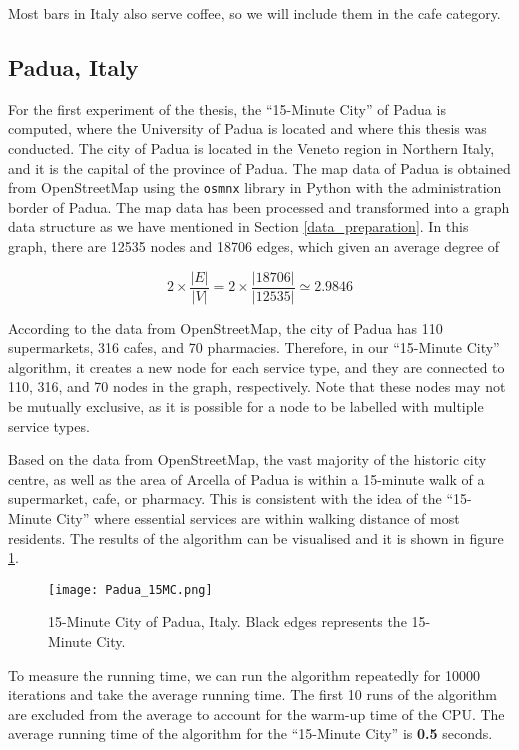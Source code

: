 Most bars in Italy also serve coffee, so we will include them in the cafe category.

\subsection{Padua, Italy}

For the first experiment of the thesis, the ``15-Minute City'' of Padua is computed, where the University of Padua is located and where this thesis was conducted. The city of Padua is located in the Veneto region in Northern Italy, and it is the capital of the province of Padua. The map data of Padua is obtained from OpenStreetMap using the \verb|osmnx| library in Python with the administration border of Padua. The map data has been processed and transformed into a graph data structure as we have mentioned in Section \ref{data_preparation}. In this graph, there are 12535 nodes and 18706 edges, which given an average degree of

$$2\times\frac{|E|}{|V|}=2\times\frac{|18706|}{|12535|}\simeq2.9846$$

According to the data from OpenStreetMap, the city of Padua has 110 supermarkets, 316 cafes, and 70 pharmacies. Therefore, in our ``15-Minute City'' algorithm, it creates a new node for each service type, and they are connected to 110, 316, and 70 nodes in the graph, respectively. Note that these nodes may not be mutually exclusive, as it is possible for a node to be labelled with multiple service types.

Based on the data from OpenStreetMap, the vast majority of the historic city centre, as well as the area of Arcella of Padua is within a 15-minute walk of a supermarket, cafe, or pharmacy. This is consistent with the idea of the ``15-Minute City'' where essential services are within walking distance of most residents. The results of the algorithm can be visualised and it is shown in figure \ref{fig:padua_15MC}.

\begin{figure}[htbp]
    \centering
    \texttt{[image: Padua\_15MC.png]}
    \caption{15-Minute City of Padua, Italy. Black edges represents the 15-Minute City.}
    \label{fig:padua_15MC}
\end{figure}

To measure the running time, we can run the algorithm repeatedly for 10000 iterations and take the average running time. The first 10 runs of the algorithm are excluded from the average to account for the warm-up time of the CPU. The average running time of the algorithm for the ``15-Minute City'' is \textbf{0.5} seconds.

